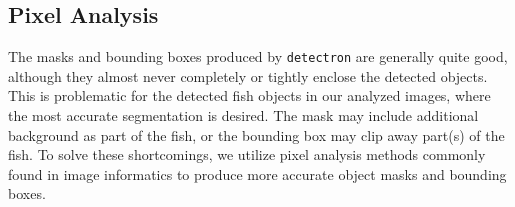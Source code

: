 \documentclass[conference]{IEEEtran}
\begin{document}

\subsection{Pixel Analysis}
The masks and bounding boxes produced by \verb|detectron| are generally quite good, although they almost never completely or tightly enclose the
detected objects.
This is problematic for the detected fish objects in our analyzed images,
where the most accurate segmentation is desired.
The mask may include additional background as part of the fish, or the
bounding box may clip away part(s) of the fish. To solve these
shortcomings, we utilize pixel analysis methods commonly found in image
informatics to produce more accurate object masks and bounding boxes.
\end{document}
